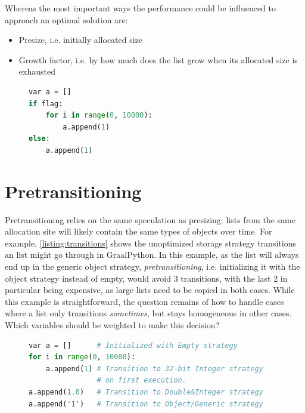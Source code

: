 \documentclass[sigconf, review, balance=false]{acmart}
\begin{document}
Whereas the most important ways the performance could be influenced to
approach an optimal solution are:
\begin{itemize}
\item Presize, i.e. initially allocated size
\item Growth factor, i.e. by how much does the list grow when its
  allocated size is exhausted
\end{itemize}

\begin{figure}[h]
\begin{lstlisting}[language=Python,label={listing:presizing_branching},
caption={Simple example of branches impacting list-size for the same
allocation site depending on external factors}]  
var a = []
if flag:
    for i in range(0, 10000):
        a.append(1)
else:
    a.append(1)
\end{lstlisting}   
\end{figure}


\section{Pretransitioning}
\label{sec:pretransitioning}
Pretransitioning relies on the same speculation as presizing: lists
from the same allocation site will likely contain the same types of
objects over time. For example, \autoref{listing:transitions} shows
the unoptimized storage strategy transitions an list might go through
in GraalPython. In this example, as the list will always end up in the
generic object strategy, \emph{pretransitioning}, i.e. initializing it
with the object strategy instead of empty, would avoid 3 transitions,
with the last 2 in particular being expensive, as large lists need
to be copied in both cases. While this example is straightforward, the
question remains of how to handle cases where a list only
transitions \emph{sometimes}, but stays homogeneous in other
cases. Which variables should be weighted to make this decision?

\begin{figure}
\begin{lstlisting}[language=Python,label={listing:transitions},
  caption={Storage strategy transitions in GraalPython}]
var a = []      # Initialized with Empty strategy
for i in range(0, 10000):
    a.append(1) # Transition to 32-bit Integer strategy 
                # on first execution.
a.append(1.0)   # Transition to Double&Integer strategy
a.append('1')   # Transition to Object/Generic strategy
    
\end{lstlisting}   
\end{figure}
\end{document}
